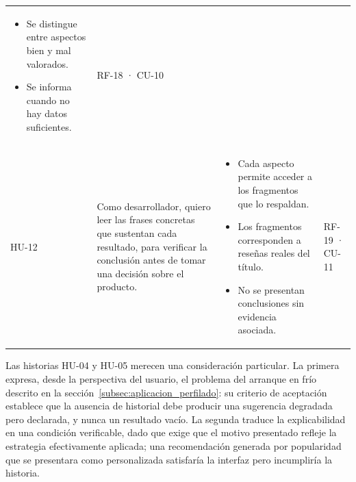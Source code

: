 \begin{longtable}{|>{\raggedright\arraybackslash}p{1cm}|>{\raggedright\arraybackslash}p{4.6cm}|>{\raggedright\arraybackslash}p{5.2cm}|>{\raggedright\arraybackslash}p{2cm}|}
\begin{itemize}[leftmargin=1em, itemsep=1pt, topsep=1pt]
		\item Se distingue entre aspectos bien y mal valorados.
		\item Se informa cuando no hay datos suficientes.
	\end{itemize} & RF-18 · CU-10 \\
	HU-12 & Como desarrollador, quiero leer las frases concretas que sustentan cada resultado, para verificar la conclusión antes de tomar una decisión sobre el producto. &
	\begin{itemize}[leftmargin=1em, itemsep=1pt, topsep=1pt]
		\item Cada aspecto permite acceder a los fragmentos que lo respaldan.
		\item Los fragmentos corresponden a reseñas reales del título.
		\item No se presentan conclusiones sin evidencia asociada.
	\end{itemize} & RF-19 · CU-11 \\
\end{longtable}
\setlength{\tabcolsep}{6pt}

Las historias HU-04 y HU-05 merecen una consideración particular. La primera expresa, desde la perspectiva del usuario, el problema del arranque en frío descrito en la sección~\ref{subsec:aplicacion_perfilado}: su criterio de aceptación establece que la ausencia de historial debe producir una sugerencia degradada pero declarada, y nunca un resultado vacío. La segunda traduce la explicabilidad en una condición verificable, dado que exige que el motivo presentado refleje la estrategia efectivamente aplicada; una recomendación generada por popularidad que se presentara como personalizada satisfaría la interfaz pero incumpliría la historia.
